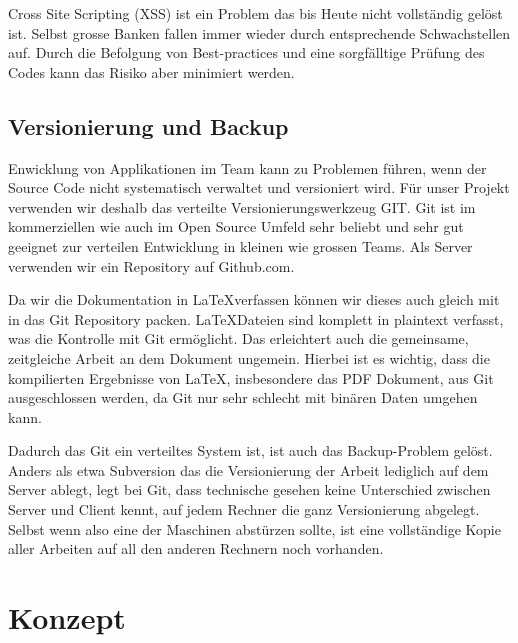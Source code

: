 \documentclass[11pt,paper=a4,final]{scrartcl}
\begin{document}
Cross Site Scripting (XSS) ist ein Problem das bis Heute nicht vollst\"andig
gel\"ost ist. Selbst grosse Banken fallen immer wieder durch entsprechende
Schwachstellen auf.\cite{heise:banken-xss} Durch die Befolgung von Best-practices und
eine sorgf\"alltige Pr\"ufung des Codes kann das Risiko aber minimiert werden.
\subsection{Versionierung und Backup}
Enwicklung von Applikationen im Team kann zu Problemen f\"uhren, wenn der Source
Code nicht systematisch verwaltet und versioniert wird. F\"ur unser Projekt
verwenden wir deshalb das verteilte Versionierungswerkzeug GIT. Git ist im
kommerziellen wie auch im Open Source Umfeld sehr beliebt und sehr gut geeignet
zur verteilen Entwicklung in kleinen wie grossen Teams. Als Server verwenden wir
ein Repository auf Github.com.

Da wir die Dokumentation in \LaTeX verfassen k\"onnen wir dieses auch gleich mit
in das Git Repository packen. \LaTeX Dateien sind komplett in plaintext
verfasst, was die Kontrolle mit Git erm\"oglicht. Das erleichtert auch die
gemeinsame, zeitgleiche Arbeit an dem Dokument ungemein. Hierbei ist es wichtig,
dass die kompilierten Ergebnisse von \LaTeX, insbesondere das PDF Dokument, aus
Git ausgeschlossen werden, da Git nur sehr schlecht mit bin\"aren Daten umgehen
kann.

Dadurch das Git ein verteiltes System ist, ist auch das Backup-Problem gel\"ost.
Anders als etwa Subversion das die Versionierung der Arbeit lediglich auf dem
Server ablegt, legt bei Git, dass technische gesehen keine Unterschied zwischen
Server und Client kennt, auf jedem Rechner die ganz Versionierung abgelegt.
Selbst wenn also eine der Maschinen abst\"urzen sollte, ist eine vollst\"andige
Kopie aller Arbeiten auf all den anderen Rechnern noch vorhanden.

\section{Konzept}
\end{document}
